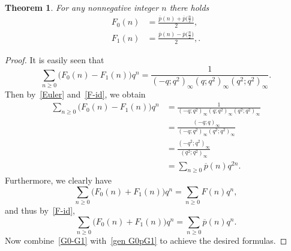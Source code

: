 \documentclass[10pt,a4paper]{amsart}
\newtheorem{theorem}{Theorem}
\newcommand{\fr}{\frac}
\begin{document}
\begin{theorem}\label{thm F01-id}
For any nonnegative integer $n$ there holds
\begin{align}
F_0(n) &= \fr{\overline{p}(n)+\overline{p}\big(\fr{n}{2}\big)}{2}, \label{F0-id} \\
F_1(n) &= \fr{\overline{p}(n)-\overline{p}\big(\fr{n}{2}\big)}{2}, \label{F1-id}.
\end{align}
\end{theorem}

\begin{proof}
It is easily seen that
\[
\sum_{n\geq 0} \big( F_0(n)-F_1(n) \big) q^n =\fr{1}{(-q;q^2)_\infty (q;q^2)_\infty (q^2;q^2)_\infty}.
\]
Then by~\eqref{Euler} and~\eqref{F-id}, we obtain
\begin{align}
\sum_{n\geq 0} \big( F_0(n)-F_1(n) \big) q^n &=\fr{1}{(-q;q^2)_\infty (q;q^2)_\infty (q^2;q^2)_\infty} \nonumber \\
&=\fr{(-q;q)_\infty}{(-q;q^2)_\infty (q^2;q^2)_\infty}  \nonumber\\
&=\fr{(-q^2;q^2)_\infty}{(q^2;q^2)_\infty} \nonumber \\
&=\sum_{n\geq 0} \overline{p}(n) q^{2n} . \label{G0-G1}
\end{align}
Furthermore, we clearly have
\[
\sum_{n\geq 0} \big( F_0(n)+F_1(n) \big) q^n = \sum_{n\geq 0} F(n) q^n,
\]
and thus by~\eqref{F-id},
\begin{equation}\label{gen G0pG1}
\sum_{n\geq 0} \big( F_0(n)+F_1(n) \big) q^n = \sum_{n\geq 0}\overline{p}(n) q^n.
\end{equation}
Now combine~\eqref{G0-G1} with~\eqref{gen G0pG1} to achieve the desired formulas.
\end{proof}
\end{document}
